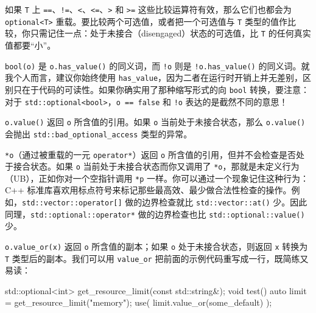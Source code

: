 如果 \texttt{T} 上 \texttt{==}、\texttt{!=}、\texttt{<}、\texttt{<=}、\texttt{>} 和 \texttt{>=} 这些比较运算符有效，那么它们也都会为 \texttt{optional<\allowbreak{}T>\allowbreak{}} 重载。要比较两个可选值，或者把一个可选值与 \texttt{T} 类型的值作比较，你只需记住一点：处于未接合（disengaged）状态的可选值，比 \texttt{T} 的任何真实值都要“小”。

\texttt{bool(\allowbreak{}o)\allowbreak{}} 是 \texttt{o.\allowbreak{}has\_\allowbreak{}value(\allowbreak{})\allowbreak{}} 的同义词，而 \texttt{!o} 则是 \texttt{!o.\allowbreak{}has\_\allowbreak{}value(\allowbreak{})\allowbreak{}} 的同义词。就我个人而言，建议你始终使用 \texttt{has\_\allowbreak{}value}，因为二者在运行时开销上并无差别，区别只在于代码的可读性。如果你确实用了那种缩写形式的向 \texttt{bool} 转换，要注意：对于 \texttt{std::\allowbreak{}optional<\allowbreak{}bool>\allowbreak{}}，\texttt{o == false} 和 \texttt{!o} 表达的是截然不同的意思！

\texttt{o.\allowbreak{}value(\allowbreak{})\allowbreak{}} 返回 \texttt{o} 所含值的引用。如果 \texttt{o} 当前处于未接合状态，那么 \texttt{o.\allowbreak{}value(\allowbreak{})\allowbreak{}} 会抛出 \texttt{std::\allowbreak{}bad\_\allowbreak{}optional\_\allowbreak{}access} 类型的异常。

\texttt{*o}（通过被重载的一元 \texttt{operator*}）返回 \texttt{o} 所含值的引用，但并不会检查是否处于接合状态。如果 \texttt{o} 当前处于未接合状态而你又调用了 \texttt{*o}，那就是未定义行为（UB），正如你对一个空指针调用 \texttt{*p} 一样。你可以通过一个现象记住这种行为：C++ 标准库喜欢用标点符号来标记那些最高效、最少做合法性检查的操作。例如，\texttt{std::\allowbreak{}vector::\allowbreak{}operator[]} 做的边界检查就比 \texttt{std::\allowbreak{}vector::\allowbreak{}at(\allowbreak{})\allowbreak{}} 少。因此同理，\texttt{std::\allowbreak{}optional::\allowbreak{}operator*} 做的边界检查也比 \texttt{std::\allowbreak{}optional::\allowbreak{}value(\allowbreak{})\allowbreak{}} 少。

\texttt{o.\allowbreak{}value\_\allowbreak{}or(\allowbreak{}x)\allowbreak{}} 返回 \texttt{o} 所含值的副本；如果 \texttt{o} 处于未接合状态，则返回 \texttt{x} 转换为 \texttt{T} 类型后的副本。我们可以用 \texttt{value\_\allowbreak{}or} 把前面的示例代码重写成一行，既简练又易读：

\begin{codebox}[cpp]
    std::optional<int> get_resource_limit(const std::string&);
    void test() {
      auto limit = get_resource_limit("memory");
      use( limit.value_or(some_default) );
    }
\end{codebox}

